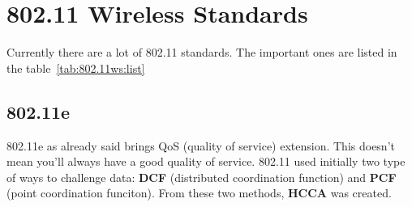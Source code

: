 \chapter{802.11 Wireless Standards}

Currently there are a lot of 802.11 standards. The important ones are listed    
in the table~\ref{tab:802.11ws:list}%

\begin{table}[t]
\centering
{}
\caption{List of most important 802.11 wireless standards}
\label{tab:802.11ws:list}
\end{table}

\section{802.11e}

802.11e as already said brings QoS (quality of service) extension. This doesn't
mean you'll always have a good quality of service.
802.11 used initially two type of ways to challenge data: \textbf{DCF}
(distributed coordination function) and \textbf{PCF} (point coordination
funciton). From these two methods, \textbf{HCCA} was created.

